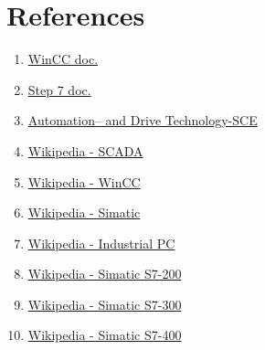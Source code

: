 \documentclass[english]{article}
\begin{document}
\section{References}
\begin{small}

\begin{enumerate}
\item  \href{http://iadt.siemens.ru/assets/files/infocenter/catalogs_and_brochures/as/ProductInfo/07_WinCC_V72_r.pdf}{WinCC doc.}
\item \href{http://w3.siemens.com/mcms/simatic-controller-software/en/step7/Pages/Default.aspx}{Step 7 doc.}
\item \href{http://docs.exdat.com/docs/index-35940.html}{Automation– and Drive Technology-SCE}
\item \href{http://en.wikipedia.org/wiki/SCADA}{Wikipedia - SCADA}
\item \href{http://en.wikipedia.org/wiki/WinCC}{Wikipedia - WinCC}
\item \href{https://ru.wikipedia.org/wiki/Simatic}{Wikipedia - Simatic}
\item \href{http://en.wikipedia.org/wiki/Industrial_PC}{Wikipedia - Industrial PC}
\item \href{https://ru.wikipedia.org/wiki/Simatic_S7-200}{Wikipedia - Simatic S7-200}
\item \href{https://ru.wikipedia.org/wiki/Simatic_S7-300}{Wikipedia - Simatic S7-300}
\item \href{https://ru.wikipedia.org/wiki/Simatic_S7-400}{Wikipedia - Simatic S7-400}
\end{enumerate}
\begin{flushright}
[\date{\today}]
\end{flushright}
\end{small}
\end{document}
